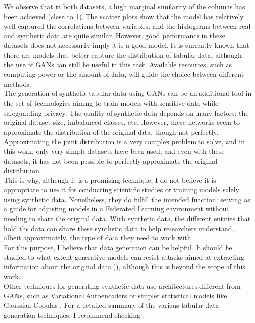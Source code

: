 We observe that in both datasets, a high marginal similarity of the columns has been achieved (close to 1). The scatter plots show that the model has relatively well captured the correlations between variables, and the histograms between real and synthetic data are quite similar. However, good performance in these datasets does not necessarily imply it is a good model. It is currently known that there are models that better capture the distribution of tabular data, although the use of GANs can still be useful in this task. Available resources, such as computing power or the amount of data, will guide the choice between different methods.\\
The generation of synthetic tabular data using GANs can be an additional tool in the set of technologies aiming to train models with sensitive data while safeguarding privacy. The quality of synthetic data depends on many factors: the original dataset size, imbalanced classes, etc. However, these networks seem to approximate the distribution of the original data, though not perfectly. Approximating the joint distribution is a very complex problem to solve, and in this work, only very simple datasets have been used, and even with these datasets, it has not been possible to perfectly approximate the original distribution.\\
This is why, although it is a promising technique, I do not believe it is appropriate to use it for conducting scientific studies or training models solely using synthetic data. Nonetheless, they do fulfill the intended function: serving as a guide for adjusting models in a Federated Learning environment without needing to share the original data. With synthetic data, the different entities that hold the data can share these synthetic data to help researchers understand, albeit approximately, the type of data they need to work with.\\
For this purpose, I believe that data generation can be helpful. It should be studied to what extent generative models can resist attacks aimed at extracting information about the original data (\cite*{sun2023}), although this is beyond the scope of this work.\\

Other techniques for generating synthetic data use architectures different from GANs, such as Variational Autoencoders \cite{xu2019} or simpler statistical models like Gaussian Copulas \cite{li2020a}. For a detailed summary of the various tabular data generation techniques, I recommend checking \cite{papadaki2024}.
